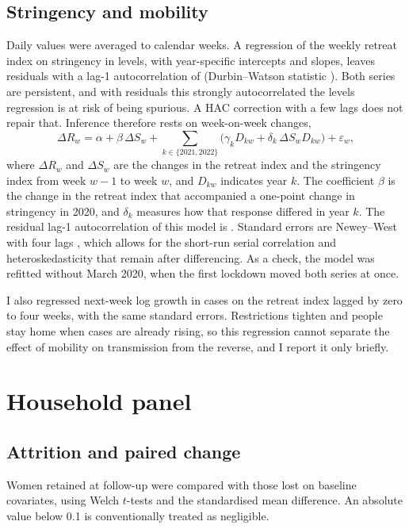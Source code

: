 \subsection{Stringency and mobility}\label{sec:policy-model}
Daily values were averaged to calendar weeks. A regression of the weekly retreat index on stringency in levels, with year-specific intercepts and slopes, leaves residuals with a lag-1 autocorrelation of \PolLevRho{} (Durbin--Watson statistic \PolLevDw). Both series are persistent, and with residuals this strongly autocorrelated the levels regression is at risk of being spurious. A HAC correction with a few lags does not repair that. Inference therefore rests on week-on-week changes,
\begin{equation}
\Delta R_w = \alpha + \beta\, \Delta S_w + \sum_{k\in\{2021,2022\}} \big(\gamma_k D_{kw} + \delta_k\, \Delta S_w D_{kw}\big) + \varepsilon_w,
\end{equation}
where $\Delta R_w$ and $\Delta S_w$ are the changes in the retreat index and the stringency index from week $w-1$ to week $w$, and $D_{kw}$ indicates year $k$. The coefficient $\beta$ is the change in the retreat index that accompanied a one-point change in stringency in 2020, and $\delta_k$ measures how that response differed in year $k$. The residual lag-1 autocorrelation of this model is \PolDifRho. Standard errors are Newey--West with four lags \parencite{newey1987}, which allows for the short-run serial correlation and heteroskedasticity that remain after differencing. As a check, the model was refitted without March 2020, when the first lockdown moved both series at once.

I also regressed next-week log growth in cases on the retreat index lagged by zero to four weeks, with the same standard errors. Restrictions tighten and people stay home when cases are already rising, so this regression cannot separate the effect of mobility on transmission from the reverse, and I report it only briefly.

\section{Household panel}
\subsection{Attrition and paired change}
Women retained at follow-up were compared with those lost on baseline covariates, using Welch $t$-tests and the standardised mean difference. An absolute value below 0.1 is conventionally treated as negligible.

